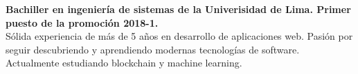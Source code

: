 

\begin{cvparagraph}

{\bfseries Bachiller en ingeniería de sistemas de la Univerisidad de Lima. Primer puesto de la promoción 2018-1.}\\
Sólida experiencia de más de 5 años en desarrollo de aplicaciones web. Pasión por seguir descubriendo y aprendiendo modernas tecnologías de software. Actualmente estudiando blockchain y machine learning.
\end{cvparagraph}
